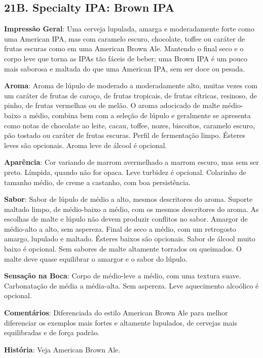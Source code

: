 \subsection*{21B. Specialty IPA: Brown IPA}
\textbf{Impressão Geral}: Uma cerveja lupulada, amarga e moderadamente forte como uma American IPA, mas com caramelo escuro, chocolate, toffee ou caráter de frutas escuras como em uma American Brown Ale. Mantendo o final seco e o corpo leve que torna as IPAs tão fáceis de beber; uma Brown IPA é um pouco mais saborosa e maltada do que uma American IPA, sem ser doce ou pesada.

\textbf{Aroma}: Aroma de lúpulo de moderado a moderadamente alto, muitas vezes com um caráter de frutas de caroço, de frutas tropicais, de frutas cítricas, resinoso, de pinho, de frutas vermelhas ou de melão. O aroma adocicado de malte médio-baixo a médio, combina bem com a seleção de lúpulo e geralmente se apresenta como notas de chocolate ao leite, cacau, toffee, nozes, biscoitos, caramelo escuro, pão tostado ou caráter de frutas escuras. Perfil de fermentação limpo. Ésteres leves são opcionais. Aroma leve de álcool é opcional.

\textbf{Aparência}: Cor variando de marrom avermelhado a marrom escuro, mas sem ser preto. Límpida, quando não for opaca. Leve turbidez é opcional. Colarinho de tamanho médio, de creme a castanho, com boa persistência.

\textbf{Sabor}: Sabor de lúpulo de médio a alto, mesmos descritores do aroma. Suporte maltado limpo, de médio-baixo a médio, com os mesmos descritores do aroma. As escolhas de malte e lúpulo não devem produzir conflitos no sabor. Amargor de médio-alto a alto, sem aspereza. Final de seco a médio, com um retrogosto amargo, lupulado e maltado. Ésteres baixos são opcionais. Sabor de álcool muito baixo é opcional. Sem sabores de malte altamente torrados ou queimados. O malte deve quase equilibrar o amargor e o sabor do lúpulo.

\textbf{Sensação na Boca}: Corpo de médio-leve a médio, com uma textura suave. Carbonatação de média a média-alta. Sem aspereza. Leve aquecimento alcoólico é opcional.

\textbf{Comentários}: Diferenciada do estilo American Brown Ale para melhor diferenciar os exemplos mais fortes e altamente lupulados, de cervejas mais equilibradas e de força padrão.

\textbf{História}: Veja American Brown Ale.

